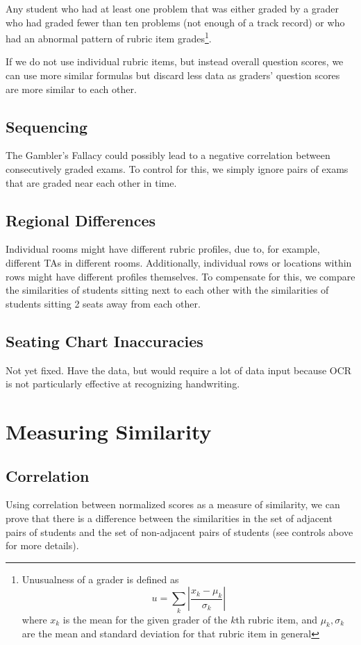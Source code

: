 \documentclass{article}
\begin{document}
        Any student who had at least one problem that was either graded by a grader who had graded fewer
            than ten problems (not enough of a track record) or who had an abnormal pattern of rubric item
            grades\footnote{Unusualness of a grader is defined as
                $$u = \sum_k \left|\frac{x_k - \mu_k}{\sigma_k}\right|$$ where $x_k$ is the mean for the
                given grader of the $k$th rubric item, and $\mu_k, \sigma_k$ are the mean and standard
                deviation for that rubric item in general}.

        If we do not use individual rubric items, but instead overall question scores, we can use
            more similar formulas but discard less data as graders' question scores are more similar
            to each other.
    \subsection{Sequencing}
        The Gambler's Fallacy could possibly lead to a negative correlation between consecutively graded
            exams. To control for this, we simply ignore pairs of exams that are graded near each other in
            time.
    \subsection{Regional Differences}
        Individual rooms might have different rubric profiles, due to, for example, different TAs in
            different rooms. Additionally, individual rows or locations within rows might have
            different profiles themselves. To compensate for this, we compare the similarities of
            students sitting next to each other with the similarities of students sitting 2 seats
            away from each other.
    \subsection{Seating Chart Inaccuracies}
        Not yet fixed. Have the data, but would require a lot of data input because OCR is not particularly
            effective at recognizing handwriting.
\section{Measuring Similarity}
    \subsection{Correlation}
        Using correlation between normalized scores as a measure of similarity, we can prove that
            there is a difference between the similarities in the set of adjacent pairs of students
            and the set of non-adjacent pairs of students (see controls above for more details).
\end{document}
